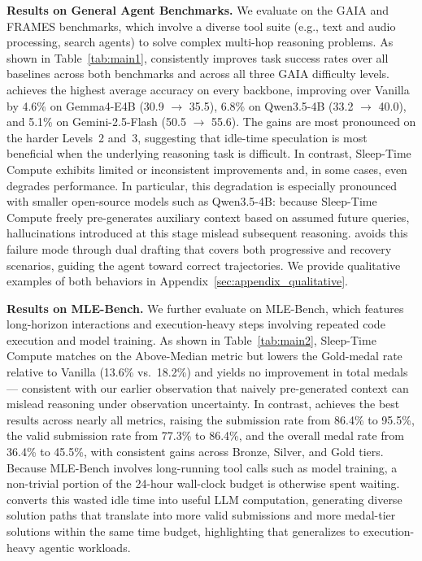 \textbf{Results on General Agent Benchmarks.}
We evaluate \methodname{} on the GAIA and FRAMES benchmarks, which involve a diverse tool suite (e.g., text and audio processing, search agents) to solve complex multi-hop reasoning problems.
As shown in Table~\ref{tab:main1}, \methodname{} consistently improves task success rates over all baselines across both benchmarks and across all three GAIA difficulty levels. \methodname{} achieves the highest average accuracy on every backbone, improving over Vanilla by 4.6\% on Gemma4-E4B (30.9 $\rightarrow$ 35.5), 6.8\% on Qwen3.5-4B (33.2 
$\rightarrow$ 40.0), and 5.1\% on Gemini-2.5-Flash (50.5
$\rightarrow$ 55.6). The gains are most pronounced on the harder Levels~2 and~3, suggesting that idle-time speculation is most beneficial when the underlying reasoning task is difficult.
In contrast, Sleep-Time Compute exhibits limited or inconsistent improvements and, in some cases, even degrades performance. In particular, this degradation is especially pronounced with smaller open-source models such as Qwen3.5-4B: because Sleep-Time Compute freely pre-generates auxiliary context based on assumed future queries, hallucinations introduced at this stage mislead subsequent reasoning. \methodname{} avoids this failure mode through dual drafting that covers both progressive and recovery scenarios, guiding the agent toward correct trajectories. We provide qualitative examples of both behaviors in Appendix~\ref{sec:appendix_qualitative}. 


\textbf{Results on MLE-Bench.} We further evaluate \methodname{} on MLE-Bench, which features long-horizon interactions and execution-heavy steps involving repeated code execution and model training. As shown in Table~\ref{tab:main2}, Sleep-Time Compute matches \methodname{} on the Above-Median metric but lowers the Gold-medal rate relative to Vanilla (13.6\% vs.\ 18.2\%) and yields no improvement in total medals --- consistent with our earlier observation that naively pre-generated context can mislead reasoning under observation uncertainty. In contrast, \methodname{} achieves the best results across nearly all metrics, raising the submission rate from 86.4\% to 95.5\%, the valid submission rate from 77.3\% to 86.4\%, and the overall medal rate from 36.4\% to 45.5\%, with consistent gains across Bronze, Silver, and Gold tiers.
Because MLE-Bench involves long-running tool calls such as model training, a non-trivial portion of the 24-hour wall-clock budget is otherwise spent waiting. \methodname{} converts this wasted idle time into useful LLM computation, generating diverse solution paths that translate into more valid submissions and more medal-tier solutions within the same time budget, highlighting that \methodname{} generalizes to execution-heavy agentic workloads.


